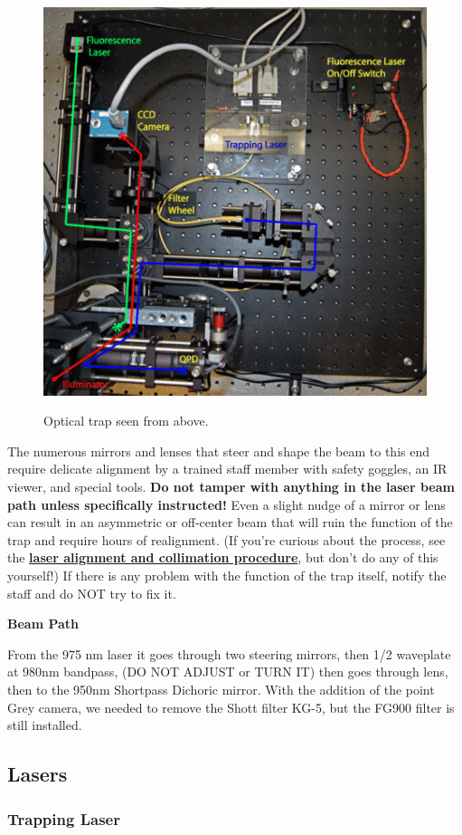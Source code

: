 \documentclass{../lab}
\begin{document}
\begin{figure}[h]
    \centering
    \href{http://experimentationlab.berkeley.edu/sites/default/files/images/450px-OTZ_From_Above.gif}{\includegraphics[width=0.5\linewidth]{images/450px-OTZ_From_Above.png}}
    \caption{Optical trap seen from above.}
    \label{fig:450px-OTZ_From_Above}
\end{figure}

The numerous mirrors and lenses that steer and shape the beam to this end require delicate alignment by a trained staff member with safety goggles, an IR viewer, and special tools. \textbf{Do not tamper with anything in the laser beam path unless specifically instructed!} Even a slight nudge of a mirror or lens can result in an asymmetric or off-center beam that will ruin the function of the trap and require hours of realignment. (If you're curious about the process, see the \href{http://experimentationlab.berkeley.edu/DesignandDocumentationOTZ#Laser\_Alignment\_and\_Collimation}{\textbf{laser alignment and collimation procedure}}, but don't do any of this yourself!) If there is any problem with the function of the trap itself, notify the staff and do NOT try to fix it.

\textbf{Beam Path}

From the 975 nm laser it goes through two steering mirrors, then 1/2 waveplate at 980nm bandpass, (DO NOT ADJUST or TURN IT) then goes through lens, then to the 950nm Shortpass Dichoric mirror. With the addition of the point Grey camera, we needed to remove the Shott filter KG-5, but the FG900 filter is still installed.

\subsection{Lasers}

\subsubsection{Trapping Laser}
\end{document}

